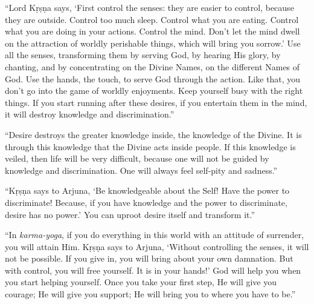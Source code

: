 \enquote{Lord Kṛṣṇa says, \enquote{First control the senses: they are easier to control, because they are outside. Control too much sleep. Control what you are eating. Control what you are doing in your actions. Control the mind. Don’t let the mind dwell on the attraction of worldly perishable things, which will bring you sorrow.} Use all the senses, transforming them by serving God, by hearing His glory, by chanting, and by concentrating on the Divine Names, on the different Names of God. Use the hands, the touch, to serve God through the action. Like that, you don’t go into the game of worldly enjoyments. Keep yourself busy with the right things. If you start running after these desires, if you entertain them in the mind, it will destroy knowledge and discrimination.}

\enquote{Desire destroys the greater knowledge inside, the knowledge of the Divine. It is through this knowledge that the Divine acts inside people. If this knowledge is veiled, then life will be very difficult, because one will not be guided by knowledge and discrimination. One will always feel self-pity and sadness.}

\enquote{Kṛṣṇa says to Arjuna, \enquote{Be knowledgeable about the Self! Have the power to discriminate! Because, if you have knowledge and the power to discriminate, desire has no power.} You can uproot desire itself and transform it.}

\enquote{In \textit{karma-yoga}, if you do everything in this world with an attitude of surrender, you will attain Him. Kṛṣṇa says to Arjuna, \enquote{Without controlling the senses, it will not be possible. If you give in, you will bring about your own damnation. But with control, you will free yourself. It is in your hands!} God will help you when you start helping yourself. Once you take your first step, He will give you courage; He will give you support; He will bring you to where you have to be.}

